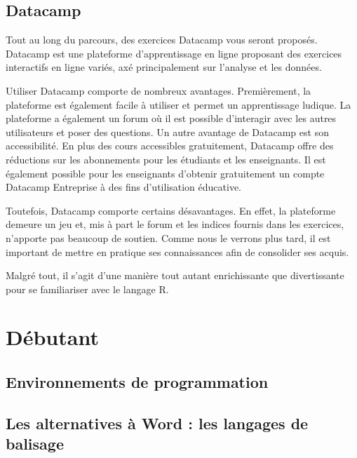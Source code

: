 \documentclass[
  letterpaper,
]{scrbook}
\begin{document}
\hypertarget{datacamp}{%
\subsection{Datacamp}\label{datacamp}}

Tout au long du parcours, des exercices Datacamp vous seront proposés.
Datacamp est une plateforme d'apprentissage en ligne proposant des
exercices interactifs en ligne variés, axé principalement sur l'analyse
et les données.

Utiliser Datacamp comporte de nombreux avantages. Premièrement, la
plateforme est également facile à utiliser et permet un apprentissage
ludique. La plateforme a également un forum où il est possible
d'interagir avec les autres utilisateurs et poser des questions. Un
autre avantage de Datacamp est son accessibilité. En plus des cours
accessibles gratuitement, Datacamp offre des réductions sur les
abonnements pour les étudiants et les enseignants. Il est également
possible pour les enseignants d'obtenir gratuitement un compte Datacamp
Entreprise à des fins d'utilisation éducative.

Toutefois, Datacamp comporte certains désavantages. En effet, la
plateforme demeure un jeu et, mis à part le forum et les indices fournis
dans les exercices, n'apporte pas beaucoup de soutien. Comme nous le
verrons plus tard, il est important de mettre en pratique ses
connaissances afin de consolider ses acquis.

Malgré tout, il s'agit d'une manière tout autant enrichissante que
divertissante pour se familiariser avec le langage R.

\hypertarget{duxe9butant}{%
\section{Débutant}\label{duxe9butant}}

\hypertarget{environnements-de-programmation}{%
\subsection{Environnements de
programmation}\label{environnements-de-programmation}}

\hypertarget{les-alternatives-uxe0-word-les-langages-de-balisage}{%
\subsection{Les alternatives à Word : les langages de
balisage}\label{les-alternatives-uxe0-word-les-langages-de-balisage}}
\end{document}
